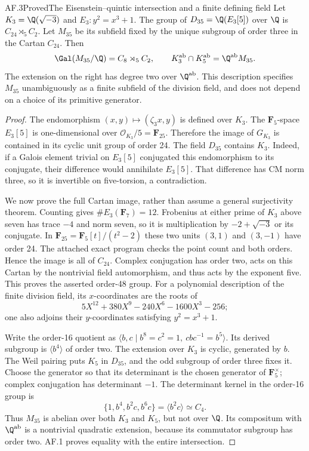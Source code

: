 \begin{statement}{AF.3}{Proved}{The Eisenstein--quintic intersection and a finite defining field}
Let $K_3=\Q(\sqrt{-3})$ and $E_3:y^2=x^3+1$. The group of
$D_{35}=\Q(E_3[5])$ over $\Q$ is $C_{24}\rtimes_5 C_2$.
Let $M_{35}$ be its subfield fixed by the unique subgroup of
order three in the Cartan $C_{24}$. Then
\[
 \Gal(M_{35}/\Q)=C_8\rtimes_5 C_2,\qquad
 K_3^{\mathrm{ab}}\cap K_5^{\mathrm{ab}}
                    =\Q^{\mathrm{ab}}M_{35}.
\]
The extension on the right has degree two over $\Q^{\mathrm{ab}}$.
This description specifies $M_{35}$ unambiguously as a finite
subfield of the division field, and does not depend on a choice
of its primitive generator.
\end{statement}
\begin{proof}
The endomorphism $(x,y)\mapsto(\zeta_3x,y)$ is defined over $K_3$.
The $\mathbf F_5$-space $E_3[5]$ is one-dimensional over
$\mathcal O_{K_3}/5=\mathbf F_{25}$. Therefore the image of
$G_{K_3}$ is contained in its cyclic unit group of order 24.
The field $D_{35}$ contains $K_3$. Indeed, if a Galois element
trivial on $E_3[5]$ conjugated this endomorphism to its conjugate,
their difference would annihilate $E_3[5]$. That difference has
CM norm three, so it is invertible on five-torsion, a contradiction.

We now prove the full Cartan image, rather than assume a general
surjectivity theorem. Counting gives $\#E_3(\mathbf F_7)=12$.
Frobenius at either prime of $K_3$ above seven has trace $-4$
and norm seven, so it is multiplication by $-2+\sqrt{-3}$ or its
conjugate. In $\mathbf F_{25}=\mathbf F_5[t]/(t^2-2)$ these two
units $(3,1)$ and $(3,-1)$ have order 24. The attached exact
program checks the point count and both orders. Hence the image
is all of $C_{24}$. Complex conjugation has order two, acts on
this Cartan by the nontrivial field automorphism, and thus acts
by the exponent five. This proves the asserted order-48 group.
For a polynomial description of the finite division field, its
$x$-coordinates are the roots of
\[
       5X^{12}+380X^9-240X^6-1600X^3-256;
\]
one also adjoins their $y$-coordinates satisfying $y^2=x^3+1$.

Write the order-16 quotient as
$\langle b,c\mid b^8=c^2=1,\ cbc^{-1}=b^5\rangle$.
Its derived subgroup is $\langle b^4\rangle$ of order two.
The extension over $K_3$ is cyclic, generated by $b$.
The Weil pairing puts $K_5$ in $D_{35}$, and the odd subgroup
of order three fixes it. Choose the generator so that its
determinant is the chosen generator of $\mathbf F_5^\times$;
complex conjugation has determinant $-1$. The determinant kernel
in the order-16 group is
\[
       \{1,b^4,b^2c,b^6c\}=\langle b^2c\rangle\simeq C_4.
\]
Thus $M_{35}$ is abelian over both $K_3$ and $K_5$, but not over
$\Q$. Its compositum with $\Q^{\mathrm{ab}}$ is a nontrivial
quadratic extension, because its commutator subgroup has order
two. AF.1 proves equality with the entire intersection.
\end{proof}

